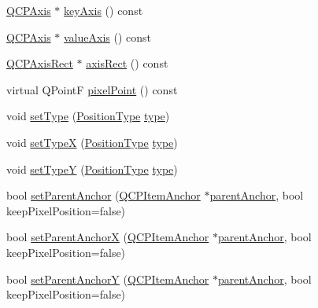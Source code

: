 \begin{DoxyCompactItemize}
\hyperlink{class_q_c_p_axis}{Q\+C\+P\+Axis} $\ast$ \hyperlink{class_q_c_p_item_position_ab99de7ae5766d246defb2de9f47eaf51}{key\+Axis} () const 
\item 
\hyperlink{class_q_c_p_axis}{Q\+C\+P\+Axis} $\ast$ \hyperlink{class_q_c_p_item_position_a8d3a039fb2e69df86b4015daa30dfd2d}{value\+Axis} () const 
\item 
\hyperlink{class_q_c_p_axis_rect}{Q\+C\+P\+Axis\+Rect} $\ast$ \hyperlink{class_q_c_p_item_position_a7f10fa702a324880cc4de958f434cec7}{axis\+Rect} () const 
\item 
virtual Q\+Point\+F \hyperlink{class_q_c_p_item_position_ae490f9c76ee2ba33752c495d3b6e8fb5}{pixel\+Point} () const 
\item 
void \hyperlink{class_q_c_p_item_position_aa476abf71ed8fa4c537457ebb1a754ad}{set\+Type} (\hyperlink{class_q_c_p_item_position_aad9936c22bf43e3d358552f6e86dbdc8}{Position\+Type} \hyperlink{class_q_c_p_item_position_aecb709d72c9aa334a7f62e2c9e0b5d60}{type})
\item 
void \hyperlink{class_q_c_p_item_position_a2113b2351d6d00457fb3559a4e20c3ea}{set\+Type\+X} (\hyperlink{class_q_c_p_item_position_aad9936c22bf43e3d358552f6e86dbdc8}{Position\+Type} \hyperlink{class_q_c_p_item_position_aecb709d72c9aa334a7f62e2c9e0b5d60}{type})
\item 
void \hyperlink{class_q_c_p_item_position_ac2a454aa5a54c1615c50686601ec4510}{set\+Type\+Y} (\hyperlink{class_q_c_p_item_position_aad9936c22bf43e3d358552f6e86dbdc8}{Position\+Type} \hyperlink{class_q_c_p_item_position_aecb709d72c9aa334a7f62e2c9e0b5d60}{type})
\item 
bool \hyperlink{class_q_c_p_item_position_ac094d67a95d2dceafa0d50b9db3a7e51}{set\+Parent\+Anchor} (\hyperlink{class_q_c_p_item_anchor}{Q\+C\+P\+Item\+Anchor} $\ast$\hyperlink{class_q_c_p_item_position_a7b4ffab9946945c0e11cd2352dc2e042}{parent\+Anchor}, bool keep\+Pixel\+Position=false)
\item 
bool \hyperlink{class_q_c_p_item_position_add71461a973927c74e42179480916d9c}{set\+Parent\+Anchor\+X} (\hyperlink{class_q_c_p_item_anchor}{Q\+C\+P\+Item\+Anchor} $\ast$\hyperlink{class_q_c_p_item_position_a7b4ffab9946945c0e11cd2352dc2e042}{parent\+Anchor}, bool keep\+Pixel\+Position=false)
\item 
bool \hyperlink{class_q_c_p_item_position_add5ec1db9d19cec58a3b5c9e0a0c3f9d}{set\+Parent\+Anchor\+Y} (\hyperlink{class_q_c_p_item_anchor}{Q\+C\+P\+Item\+Anchor} $\ast$\hyperlink{class_q_c_p_item_position_a7b4ffab9946945c0e11cd2352dc2e042}{parent\+Anchor}, bool keep\+Pixel\+Position=false)

\end{DoxyCompactItemize}
